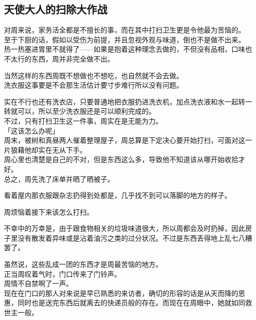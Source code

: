 \subsection{天使大人的扫除大作战}

对周来说，家务活全都是不擅长的事，而在其中打扫卫生更是令他最为苦恼的。\\

至于下厨的话，假如以受伤为前提，并且忽视外观与味道，倒也不是做不出来。\\

热一热塞进胃里不就得了——如果是抱着这种理念去做的，不但没有品相，口味也不太行的东西，周并非完全做不出。

当然这样的东西周既不想做也不想吃，也自然就不会去做。\\

洗衣服这事要是不会那生活估计要寸步难行所以没有问题。

实在不行也还有洗衣店，只要普通地把衣服扔进洗衣机，加点洗衣液和水一起转一转就可以，所以至少洗衣服还是可以顺利完成的。\\

不过，只有打扫卫生这一件事，周实在是无能为力。\\

「这该怎么办呢」\\

周末，被树和真昼两人催着整理屋子，周总算是下定决心要开始打扫，可面对这一片狼藉他却实在无从下手。\\

周心里也清楚是自己的不对，但是东西这么多，导致他不知道该从哪开始收拾才好。\\

总之，周先洗了床单并晒了晒被子。

看着屋内那衣服跟杂志扔得到处都是，几乎找不到可以落脚的地方的样子。

周烦恼着接下来该怎么打扫。

不幸中的万幸是，由于跟食物相关的垃圾味道很大，所以周都会及时扔掉，因此房子里没有散发着异味或是沾着油污之类的过分状况。不过是东西丢得地上乱七八糟罢了。

虽然说，这些乱成一团的东西才是周最苦恼的地方。\\

正当周叹着气时，门口传来了门铃声。\\

周情不自禁啊了一声。\\

现在在门口的那人对来说是早已熟悉的来访者，确切的形容的话是从天而降的恩惠，同时也是送完东西后就离去的快递员般的存在。而现在在周眼中，她就如同救世主一般。

